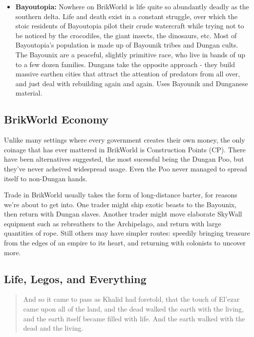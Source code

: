 \documentclass[12pt,a4paper,twocolumn]{article}
\begin{document}
\begin{itemize}
\item {\bf Bayoutopia:} Nowhere on BrikWorld is life quite so abundantly deadly as the southern delta.  Life and death exist in a constant struggle, over which the stoic residents of Bayoutopia pilot their crude watercraft while trying not to be noticed by the crocodiles, the giant insects, the dinosaurs, etc.  Most of Bayoutopia's population is made up of Bayounik tribes and Dungan cults.  The Bayounix are a peaceful, slightly primitive race, who live in bands of up to a few dozen families.  Dungans take the opposite approach - they build massive earthen cities that attract the attention of predators from all over, and just deal with rebuilding again and again.  Uses Bayounik and Dunganese material. 

\end{itemize}

\subsection{BrikWorld Economy}

Unlike many settings where every government creates their own money, the only coinage that has ever mattered in BrikWorld is Construction Points (CP).  There have been alternatives suggested, the most sucessful being the Dungan Poo, but they've never acheived widespread usage.  Even the Poo never managed to spread itself to non-Dungan hands.

Trade in BrikWorld usually takes the form of long-distance barter, for reasons we're about to get into.  One trader might ship exotic beasts to the Bayounix, then return with Dungan slaves.  Another trader might move elaborate SkyWall equipment such as rebreathers to the Archipelago, and return with large quantities of rope.  Still others may have simpler routes: speedily bringing treasure from the edges of an empire to its heart, and returning with colonists to uncover more.

\subsection{Life, Legos, and Everything}
\begin{quote}
And so it came to pass as Khalid had foretold, that the touch of El'ezar came upon all of the land, and the dead walked the earth with the living, and the earth itself became filled with life.  And the earth walked with the dead and the living.
\end{quote}
\end{document}

